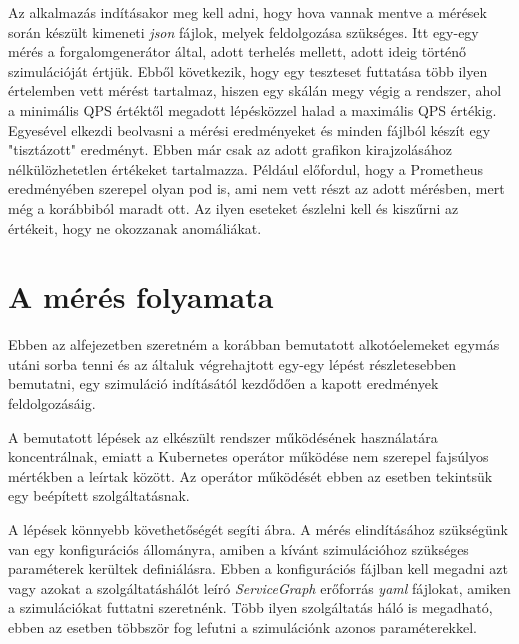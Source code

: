 %

Az alkalmazás indításakor meg kell adni, hogy hova vannak mentve a mérések során készült kimeneti \textit{json} fájlok, melyek feldolgozása szükséges.
Itt egy-egy mérés a forgalomgenerátor által, adott terhelés mellett, adott ideig történő szimulációját értjük.
Ebből következik, hogy egy teszteset futtatása több ilyen értelemben vett mérést tartalmaz, hiszen egy skálán megy végig a rendszer, ahol a minimális QPS értéktől megadott lépésközzel halad a maximális QPS értékig. 
Egyesével elkezdi beolvasni a mérési eredményeket és minden fájlból készít egy "tisztázott" eredményt.
Ebben már csak az adott grafikon kirajzolásához nélkülözhetetlen értékeket tartalmazza.
Például előfordul, hogy a Prometheus eredményében szerepel olyan pod is, ami nem vett részt az adott mérésben, mert még a korábbiból maradt ott.
Az ilyen eseteket észlelni kell és kiszűrni az értékeit, hogy ne okozzanak anomáliákat. 

\section{A mérés folyamata}
\label{sec:measure_steps}

Ebben az alfejezetben szeretném a korábban bemutatott alkotóelemeket egymás utáni sorba tenni és az általuk végrehajtott egy-egy lépést részletesebben bemutatni, egy szimuláció indításától kezdődően a kapott eredmények feldolgozásáig.

A bemutatott lépések az elkészült rendszer működésének használatára koncentrálnak, emiatt a Kubernetes operátor működése nem szerepel fajsúlyos mértékben a leírtak között.
Az operátor működését ebben az esetben tekintsük egy beépített szolgáltatásnak.

A lépések könnyebb követhetőségét segíti  ábra.
A mérés elindításához szükségünk van egy konfigurációs állományra, amiben a kívánt szimulációhoz szükséges paraméterek kerültek definiálásra.
Ebben a konfigurációs fájlban kell megadni azt vagy azokat a szolgáltatáshálót leíró \textit{ServiceGraph} erőforrás \textit{yaml} fájlokat, amiken a szimulációkat futtatni szeretnénk.
Több ilyen szolgáltatás háló is megadható, ebben az esetben többször fog lefutni a szimulációnk azonos paraméterekkel.


